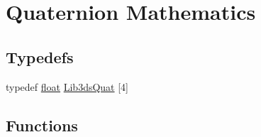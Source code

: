 \hypertarget{group__quat}{\section{Quaternion Mathematics}
\label{group__quat}
}
\subsection*{Typedefs}
\begin{DoxyCompactItemize}
\item 
typedef \hyperlink{_super_l_u_support_8h_a6a1bb6ed41f44b60e7bd83b0e9945aa7}{float} \hyperlink{group__quat_ga9969ef1e618ba698c4b8374f14b548be}{Lib3ds\-Quat} \mbox{[}4\mbox{]}
\end{DoxyCompactItemize}
\subsection*{Functions}

